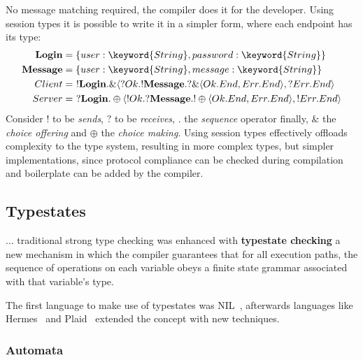 No message matching required, the compiler does it for the developer.
Using session types it is possible to write it in a simpler form,
where each endpoint has its type:
\begin{equation*}
    \begin{aligned}
        \mathbf{Login}   & = \{user: \keyword{String}, password: \keyword{String}\}                                                       \\
        \mathbf{Message} & = \{user: \keyword{String}, message: \keyword{String}\}                                                        \\
        Client           & = ~!\mathbf{Login}.\&\langle ?Ok.!\mathbf{Message}.?\&\langle Ok.End, Err.End \rangle, ?Err.End\rangle         \\
        Server           & = ~?\mathbf{Login}.\oplus\langle !Ok.?\mathbf{Message}.!\oplus\langle Ok.End, Err.End \rangle, !Err.End\rangle \\
    \end{aligned}
\end{equation*}
Consider $!$ to be \emph{sends}, $?$ to be \emph{receives}, $.$ the \emph{sequence} operator finally,
$\&$ the \emph{choice offering} and $\oplus$ the \emph{choice making}.
Using session types effectively offloads complexity to the type system,
resulting in more complex types, but simpler implementations,
since protocol compliance can be checked during compilation and boilerplate can be added by the compiler.

\subsection{Typestates}\label{sec:typestates}

\begin{displayquote}
    ... traditional strong type checking was enhanced with \textbf{typestate checking}
    a new mechanism in which the compiler guarantees that for all execution paths,
    the sequence of operations on each variable obeys a finite state grammar associated with that variable's type.
\end{displayquote}

The first language to make use of typestates was NIL~\autocite{Strom1983},
afterwards languages like Hermes~\autocite{Strom1990} and Plaid~\autocite{Aldrich2009}
extended the concept with new techniques.

\subsubsection*{Automata}

